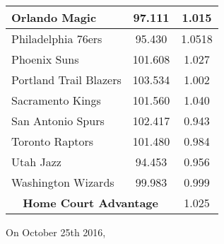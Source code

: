 \begin{table}[t]
\begin{tabular}{|l|c|c|}
		Orlando Magic & 97.111 & 1.015\\ \hline
		Philadelphia 76ers & 95.430 & 1.0518\\ \hline
		Phoenix Suns & 101.608 & 1.027\\ \hline
		Portland Trail Blazers & 103.534 & 1.002\\ \hline
		Sacramento Kings & 101.560 & 1.040\\ \hline
		San Antonio Spurs & 102.417 & 0.943\\ \hline
		Toronto Raptors & 101.480 & 0.984 \\ \hline
		Utah Jazz & 94.453 & 0.956\\ \hline
		Washington Wizards & 99.983 & 0.999\\ \hline
		\multicolumn{2}{|c|}{\textbf{Home Court Advantage}} & 1.025\\ \hline
	\end{tabular}
	\label{table:dc_141516}
\end{table}


On October 25th 2016,

